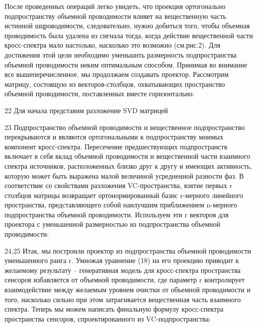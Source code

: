 После проведенных операций легко увидеть, что проекция ортогонально подпространству объемной проводимости
влияет на вещественную часть истинной шцроводимости, следовательно, нужно добиться того, чтобы объемная проводимость была удалена из сигнала тогда, когда действие вещественной части кросс-спектра мало настолько, насколько это возможно (см.рис.2). Для достижения этой цели необходимо уменьшить размерность подпространства объемной проводимости неким оптимальным способом.
Принимая во внимание все вышеперечисленное, мы продолжаем создавать проектор. Рассмотрим матрицу, состоящую из векторов-столбцов, охватывающих пространство объемной проводимости, поставленных вместе горизонтально:

22
Для начала представим разложение SVD матрицей 

23
Подпространство объемной проводимости и вещественное подпространство перекрываются и являются ортогональными к подпространству мнимых компонент кросс-спектра. Пересечение предшествующих подпространств включает в себя вклад объемной проводимости и вещественной части взаимного спектра источников, расположенных близко друг к другу и имеющих активность, которую может быть выражена малой величиной усредненной разности фаз. 
В соответствие со свойствами разложения VC-пространства, взятие первых r столбцов матрицы возвращает ортонормированный базис r-мерного линейного пространства, представляющего собой наилучшим приближением n-мерного подпространства объемной проводимости. Используем эти r векторов для проектора с уменьшенной размерностью из подпространства объемной проводимости:

24,25
Итак, мы построили проектор из подпространства объемной проводимости уменьшенного ранга r.
Умножая уравнение (18) на его проекцию приводит к желаемому результату – генеративная модель для кросс-спектра пространства сенсоров избавляется от объемной проводимости, где параметр r контролирует взаимодействие между желаемым уровнем очистки от объемной проводимости и того, насколько сильно при этом затрагивается вещественная часть взаимного спектра. Теперь мы можем написать финальную формулу кросс-спектра пространства сенсоров, спроектированного из VC-подпространства:

